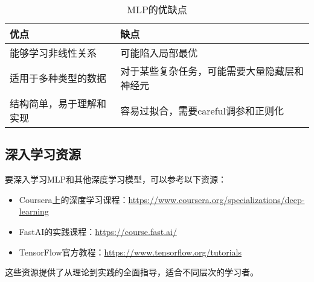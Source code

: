 \begin{table}
    \centering
    \begin{tabular}{p{}p{}}
    \toprule
    优点 & 缺点 \\
    \midrule
    能够学习非线性关系 & 可能陷入局部最优 \\
    适用于多种类型的数据 & 对于某些复杂任务，可能需要大量隐藏层和神经元 \\
    结构简单，易于理解和实现 & 容易过拟合，需要careful调参和正则化 \\
    \bottomrule
    \end{tabular}
    \caption{MLP的优缺点}
    \label{tab:mlp_pros_cons}
\end{table}

\subsection{深入学习资源}

要深入学习MLP和其他深度学习模型，可以参考以下资源：

\begin{itemize}
    \item Coursera上的深度学习课程：\url{https://www.coursera.org/specializations/deep-learning}
    \item FastAI的实践课程：\url{https://course.fast.ai/}
    \item TensorFlow官方教程：\url{https://www.tensorflow.org/tutorials}
\end{itemize}

这些资源提供了从理论到实践的全面指导，适合不同层次的学习者。
